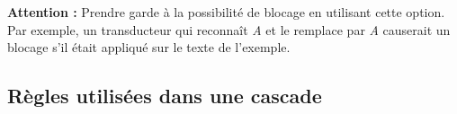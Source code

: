 \bigskip
\large{\textbf{Attention :}} Prendre garde à la possibilité de blocage en utilisant cette 
option. Par exemple, un transducteur qui reconnaît \emph{A} et le remplace par
\emph{A} causerait un blocage s'il était appliqué sur le texte de l'exemple.

\subsection{Règles utilisées dans une cascade}

